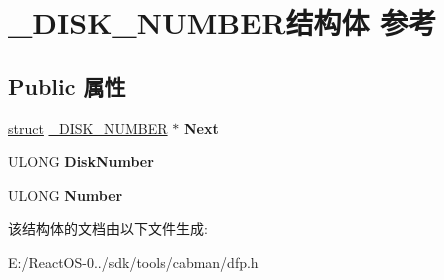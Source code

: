 \hypertarget{struct___d_i_s_k___n_u_m_b_e_r}{}\section{\+\_\+\+D\+I\+S\+K\+\_\+\+N\+U\+M\+B\+E\+R结构体 参考}
\label{struct___d_i_s_k___n_u_m_b_e_r}
\subsection*{Public 属性}
\begin{DoxyCompactItemize}
\item 
\mbox{\label{struct___d_i_s_k___n_u_m_b_e_r_a02fba3fa1883db5a40498977d751a060}} 
\hyperlink{interfacestruct}{struct} \hyperlink{struct___d_i_s_k___n_u_m_b_e_r}{\+\_\+\+D\+I\+S\+K\+\_\+\+N\+U\+M\+B\+ER} $\ast$ {\bfseries Next}
\item 
\mbox{\label{struct___d_i_s_k___n_u_m_b_e_r_addfe2c39619da4857dbd4742de162cb6}} 
U\+L\+O\+NG {\bfseries Disk\+Number}
\item 
\mbox{\label{struct___d_i_s_k___n_u_m_b_e_r_a86f84d5aaa9181180e6426a5e9acb356}} 
U\+L\+O\+NG {\bfseries Number}
\end{DoxyCompactItemize}


该结构体的文档由以下文件生成\+:\begin{DoxyCompactItemize}
\item 
E\+:/\+React\+O\+S-\/0../sdk/tools/cabman/dfp.\+h\end{DoxyCompactItemize}
